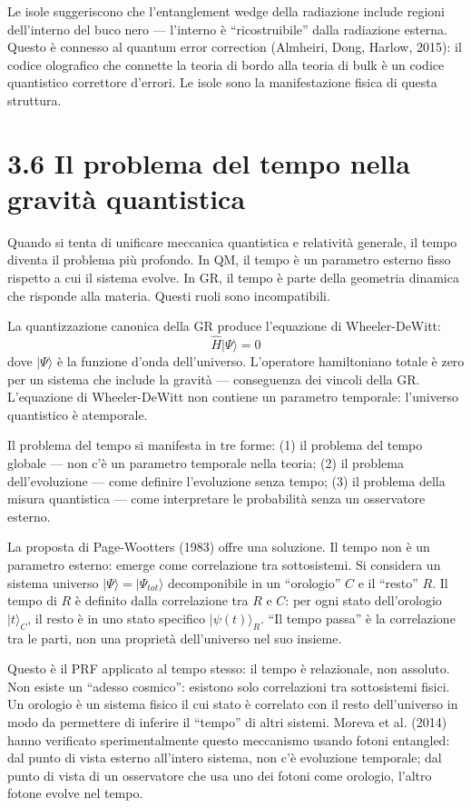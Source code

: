 \documentclass[11.5pt,a4paper,openany]{book}
\theoremstyle{remark}
\begin{document}
Le isole suggeriscono che l'entanglement wedge della radiazione include regioni dell'interno del buco nero --- l'interno è ``ricostruibile'' dalla radiazione esterna. Questo è connesso al quantum error correction (Almheiri, Dong, Harlow, 2015): il codice olografico che connette la teoria di bordo alla teoria di bulk è un codice quantistico correttore d'errori. Le isole sono la manifestazione fisica di questa struttura.

\section{3.6 Il problema del tempo nella gravità quantistica}

Quando si tenta di unificare meccanica quantistica e relatività generale, il tempo diventa il problema più profondo. In QM, il tempo è un parametro esterno fisso rispetto a cui il sistema evolve. In GR, il tempo è parte della geometria dinamica che risponde alla materia. Questi ruoli sono incompatibili.

La quantizzazione canonica della GR produce l'equazione di Wheeler-DeWitt:
\[
\hat{H}|\Psi\rangle = 0
\]
dove $|\Psi\rangle$ è la funzione d'onda dell'universo. L'operatore hamiltoniano totale è zero per un sistema che include la gravità --- conseguenza dei vincoli della GR. L'equazione di Wheeler-DeWitt non contiene un parametro temporale: l'universo quantistico è atemporale.

Il problema del tempo si manifesta in tre forme: (1) il problema del tempo globale --- non c'è un parametro temporale nella teoria; (2) il problema dell'evoluzione --- come definire l'evoluzione senza tempo; (3) il problema della misura quantistica --- come interpretare le probabilità senza un osservatore esterno.

La proposta di Page-Wootters (1983) offre una soluzione. Il tempo non è un parametro esterno: emerge come correlazione tra sottosistemi. Si considera un sistema universo $|\Psi\rangle = |\Psi_{tot}\rangle$ decomponibile in un ``orologio'' $C$ e il ``resto'' $R$. Il tempo di $R$ è definito dalla correlazione tra $R$ e $C$: per ogni stato dell'orologio $|t\rangle_C$, il resto è in uno stato specifico $|\psi(t)\rangle_R$. ``Il tempo passa'' è la correlazione tra le parti, non una proprietà dell'universo nel suo insieme.

Questo è il PRF applicato al tempo stesso: il tempo è relazionale, non assoluto. Non esiste un ``adesso cosmico'': esistono solo correlazioni tra sottosistemi fisici. Un orologio è un sistema fisico il cui stato è correlato con il resto dell'universo in modo da permettere di inferire il ``tempo'' di altri sistemi. Moreva et al. (2014) hanno verificato sperimentalmente questo meccanismo usando fotoni entangled: dal punto di vista esterno all'intero sistema, non c'è evoluzione temporale; dal punto di vista di un osservatore che usa uno dei fotoni come orologio, l'altro fotone evolve nel tempo.
\end{document}
